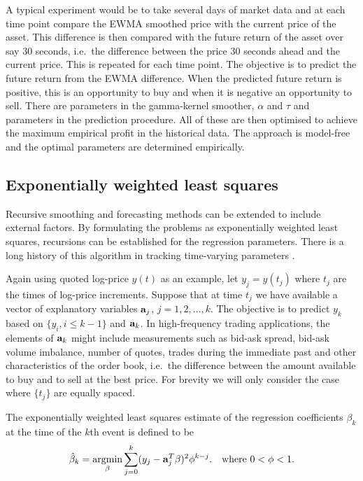 A typical experiment would be to take several days of market data and at each time point compare the EWMA smoothed price with the current price of the asset. This difference is then compared with the future return of the asset over say 30 seconds, i.e.\ the difference between the price 30 seconds ahead and the current price.  This is repeated for each time point. The objective is to predict the future return from the EWMA difference.   When the predicted future return is positive, this is an opportunity to buy and when it is negative an opportunity to sell. There are parameters in the gamma-kernel smoother, $\alpha$ and $\tau$ and parameters in the prediction procedure. All of these are then optimised to achieve the maximum empirical profit in the historical data. The approach is model-free and the optimal parameters are determined empirically.   
\subsection{Exponentially weighted least squares}\label{sec:EWLS}
Recursive smoothing and forecasting methods can be extended to include external factors. By formulating the problems as exponentially weighted least squares, recursions can be established for the regression parameters.  There is a long history of this algorithm in tracking time-varying parameters \citep{brown2004smoothing}. 

Again using quoted log-price $y(t)$ as an example, let $y_j = y(t_j)$ where $t_j$ are the times of log-price increments. Suppose that at time $t_j$ we have available a vector of explanatory variables $\mathbf{a}_j$, $j=1,2,\dots,k$. The objective is to predict $y_{k}$ based on $\{y_i,i \leqslant k-1 \}$ and $\mathbf{a}_k$. In high-frequency trading applications, the elements of $\mathbf{a}_k$ might include measurements such as bid-ask spread, bid-ask volume imbalance, number of quotes, trades during the immediate past and other characteristics of the order book, i.e.\ the difference between the amount available to buy and to sell at the best price. For brevity we will only consider the case where $\{t_j\}$ are equally spaced. 

The exponentially weighted least squares estimate of the regression coefficients $\beta_k$ at the time of the $k$th event is defined to be
\begin{equation}\label{eq:RLSobjective} 
\hat{\beta}_k= \underset{\beta}{\text{argmin}} \sum_{j=0}^k (y_j  - \mathbf{a}_j^T \beta)^2 \phi^{k-j} .
 \quad \text{where $0 < \phi < 1$}.
\end{equation}


